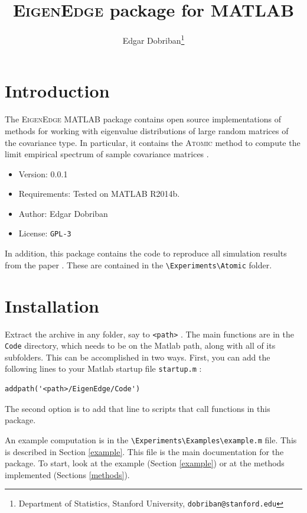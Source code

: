 \documentclass[english,11pt]{article} %
\title{\textsc{EigenEdge} package for MATLAB}
\author{Edgar Dobriban\thanks{Department of Statistics, Stanford University, \texttt{dobriban@stanford.edu}} }
\begin{document}
\maketitle
\tableofcontents
\section{Introduction}

The \textsc{EigenEdge} MATLAB package contains open source implementations of methods for working with eigenvalue distributions of large random matrices of the covariance type. In particular, it contains the \textsc{Atomic} method to compute the limit empirical spectrum of sample covariance matrices \citep[proposed in][]{dobriban2015precise}. 

\begin{itemize}
\item{Version: } 0.0.1
\item{Requirements: } Tested on MATLAB R2014b. 
\item{Author: } Edgar Dobriban
\item{License: } \verb+GPL-3+
\end{itemize}

In addition, this package contains the code to reproduce all simulation results from the paper \cite{dobriban2015precise}. These are contained in the \verb+\Experiments\Atomic+ folder.

\section{Installation}

Extract the archive in any folder, say to \verb+<path>+ . The main functions are in the \verb+Code+ directory, which needs to be on the Matlab path, along with all of its subfolders. This can be accomplished in two ways. First, you can add the following lines to your Matlab startup file \verb+startup.m+ :

\begin{verbatim}
addpath('<path>/EigenEdge/Code')
\end{verbatim}

The second option is to add that line to scripts that call functions in this package. 

An example computation is in the \verb+\Experiments\Examples\example.m+ file. This is described in Section \ref{example}. This file is the main documentation for the package. To start, look at the example (Section \ref{example}) or at the methods implemented (Sections \ref{methods}).
\end{document}
